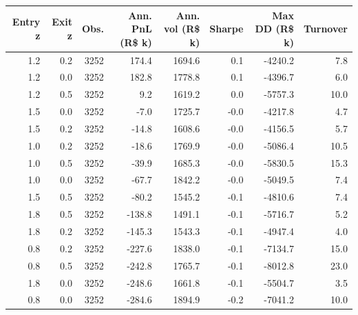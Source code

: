 \begin{tabular}{rrrrrrrr}
\toprule
Entry z & Exit z & Obs. & Ann. PnL (R\$ k) & Ann. vol (R\$ k) & Sharpe & Max DD (R\$ k) & Turnover \\
\midrule
1.2 & 0.2 & 3252 & 174.4 & 1694.6 & 0.1 & -4240.2 & 7.8 \\
1.2 & 0.0 & 3252 & 182.8 & 1778.8 & 0.1 & -4396.7 & 6.0 \\
1.2 & 0.5 & 3252 & 9.2 & 1619.2 & 0.0 & -5757.3 & 10.0 \\
1.5 & 0.0 & 3252 & -7.0 & 1725.7 & -0.0 & -4217.8 & 4.7 \\
1.5 & 0.2 & 3252 & -14.8 & 1608.6 & -0.0 & -4156.5 & 5.7 \\
1.0 & 0.2 & 3252 & -18.6 & 1769.9 & -0.0 & -5086.4 & 10.5 \\
1.0 & 0.5 & 3252 & -39.9 & 1685.3 & -0.0 & -5830.5 & 15.3 \\
1.0 & 0.0 & 3252 & -67.7 & 1842.2 & -0.0 & -5049.5 & 7.4 \\
1.5 & 0.5 & 3252 & -80.2 & 1545.2 & -0.1 & -4810.6 & 7.4 \\
1.8 & 0.5 & 3252 & -138.8 & 1491.1 & -0.1 & -5716.7 & 5.2 \\
1.8 & 0.2 & 3252 & -145.3 & 1543.3 & -0.1 & -4947.4 & 4.0 \\
0.8 & 0.2 & 3252 & -227.6 & 1838.0 & -0.1 & -7134.7 & 15.0 \\
0.8 & 0.5 & 3252 & -242.8 & 1765.7 & -0.1 & -8012.8 & 23.0 \\
1.8 & 0.0 & 3252 & -248.6 & 1661.8 & -0.1 & -5504.7 & 3.5 \\
0.8 & 0.0 & 3252 & -284.6 & 1894.9 & -0.2 & -7041.2 & 10.0 \\
\bottomrule
\end{tabular}
